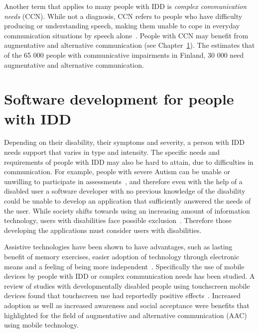 \documentclass[utf8,english]{gradu3}
\begin{document}
Another term that applies to many people with IDD is \textit{complex communication needs} (CCN).
While not a diagnosis, CCN refers to people who have difficulty producing or understanding speech,
making them unable to cope in everyday communication situations by speech alone~\parencite{kehitysvammaliittoCCN}.
People with CCN may benefit from augmentative and alternative communication (see Chapter~\ref{softat}).
The \textcite{kehitysvammaliittoCCN} estimates that of the 65 000 people with communicative impairments in Finland,
30 000 need augmentative and alternative communication.


\section{Software development for people with IDD} \label{softat}

Depending on their disability, their symptoms and severity,
a person with IDD needs support that varies in type and intensity.
The specific needs and requirements of people with IDD may also
be hard to attain, due to difficulties in communication.
For example, people with severe Autism can be unable or unwilling
to participate in assessments~\parencite{holt2014},
and therefore even with the help of a disabled user
a software developer with no previous knowledge
of the disability could be unable to develop an application
that sufficiently answered the needs of the user.
While society shifts towards using an increasing amount of information technology,
users with disabilities face possible exclusion~\parencite{dekelver2015}.
Therefore those developing the applications must consider users with disabilities.

Assistive technologies have been shown to have advantages,
such as lasting benefit of memory exercises, easier adoption of technology through electronic means
and a feeling of being more independent~\parencite{dekelver2015}.
Specifically the use of mobile devices by people with IDD or complex communication needs has been studied.
A review of studies with developmentally disabled people using touchscreen mobile devices
found that touchscreen use had reportedly positive effects~\parencite{stephenson2015}.
Increased adoption as well as increased awareness and social acceptance
were benefits that \textcite{mcnaughton2013} highlighted for the field of
augmentative and alternative communication (AAC) using mobile technology.
\end{document}
